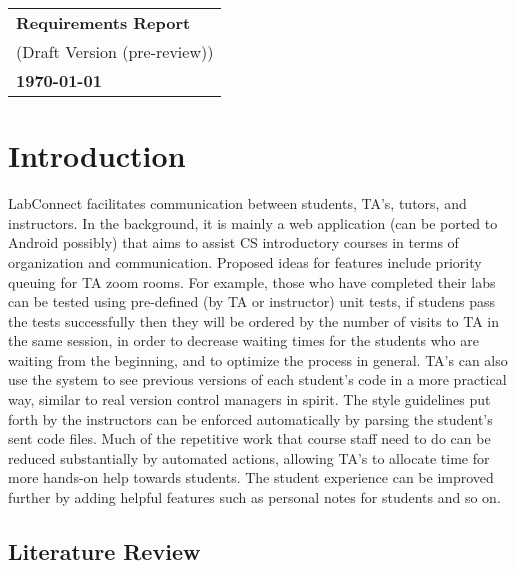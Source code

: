 \documentclass[a4paper, 12pt]{article}
\begin{document}
    \begin{table}[h!]
        \renewcommand{\arraystretch}{1.5}
        \centering
        \begin{tabular}{ |>{\centering\arraybackslash}m{15.15cm}| }
            \hline
            \Large \textbf{Requirements Report} \\
            \small (Draft Version (pre-review)) \\
            \small \textbf{\today} \\
            \hline
        \end{tabular}
    \end{table}


    \section{Introduction}

    LabConnect facilitates communication between students, TA's, tutors,
    and instructors. In the background, it is mainly a web application
    (can be ported to Android possibly) that aims to assist CS introductory
    courses in terms of organization and communication. Proposed ideas for
    features include priority queuing for TA zoom rooms. For example, those
    who have completed their labs can be tested using pre-defined (by TA or
    instructor) unit tests, if studens pass the tests successfully then they will be
    ordered by the number of visits to TA in the same session, in order to decrease
    waiting times for the students who are waiting from the beginning, and
    to optimize the process in general. TA's can also use the system to see
    previous versions of each student's code in a more practical way,
    similar to real version control managers in spirit. The style guidelines
    put forth by the instructors can be enforced automatically by parsing
    the student's sent code files. Much of the repetitive work that course
    staff need to do can be reduced substantially by automated actions,
    allowing TA's to allocate time for more hands-on help towards students.
    The student experience can be improved further by adding helpful
    features such as personal notes for students and so on.

    \subsection{Literature Review}
\end{document}
